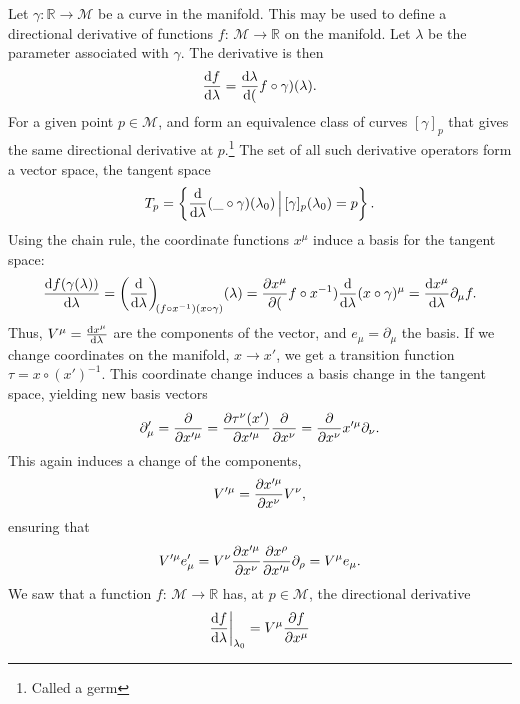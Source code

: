 Let $\gamma: \mathbb{R} \rightarrow \mathcal{M}$ be a curve in the manifold.
This may be used to define a directional derivative of functions $f:\, \mathcal{M} \rightarrow \mathbb{R}$ on the manifold. 
Let $\lambda$ be the parameter associated with $\gamma$. 
The derivative is then
\begin{equation*}
    \odv{f}{\lambda} = \odv{\lambda} (f\circ\gamma)(\lambda).
\end{equation*}
For a given point $p \in \mathcal{M}$, and form an equivalence class of curves $[\gamma]_p$ that gives the same directional derivative at $p$.\footnote{Called a germ} The set of all such derivative operators form a vector space, the tangent space
\begin{equation*}
    T_p = \left\{ { \odv{}{\lambda} (\_ \circ\gamma)(\lambda_0) \,\Big| \, [\gamma]_p(\lambda_0) = p }\right\}.
\end{equation*}
Using the chain rule, the coordinate functions $x^\mu$ induce a basis for the tangent space:
\begin{equation*}
    \odv{f(\gamma(\lambda))}{\lambda} = \odv{}{\lambda}[(f \circ x^{-1})(x \circ \gamma)](\lambda) 
    = \pdv{x^\mu}(f \circ x^{-1}) \odv{}{\lambda}(x \circ \gamma)^\mu = \odv{x^\mu}{\lambda}\partial_\mu f.
\end{equation*}
Thus, $V^\mu = \odv{x^\mu}{\lambda}$ are the components of the vector, and $e_\mu = \partial_\mu$ the basis. If we change coordinates on the manifold, $x \rightarrow x'$, we get a transition function $\tau = x \circ (x')^{-1}$.
This coordinate change induces a basis change in the tangent space, yielding new basis vectors
\begin{equation*}
    \partial_\mu' = \pdv{}{x'^\mu} = \pdv{\tau^\nu(x')}{x'^\mu} \pdv{}{x^\nu} = \pdv{}{x^\nu}{x'^\mu} \partial_\nu.
\end{equation*}
This again induces a change of the components,
\begin{equation*}
    V'^\mu = \pdv{x'^\mu}{x^\nu} V^\nu, 
\end{equation*}
ensuring that
\begin{equation*}
    V'^\mu e'_\mu = V^\nu \pdv{x'^\mu}{x^\nu} \pdv{x^\rho}{x'^\mu} \partial_\rho = V^\mu e_\mu.
\end{equation*}
We saw that a function $f: \, \mathcal{M} \rightarrow \mathbb{R}$ has, at $p \in \mathcal{M}$, the directional derivative
\begin{equation*}
    \odv{f}{\lambda} \bigg |_{\lambda_0} = V^\mu \pdv{f}{x^\mu}
\end{equation*}
